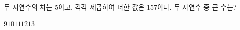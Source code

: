 두 자연수의 차는 $5$이고, 각각 제곱하여 더한 값은 $157$이다. 두 자연수 중 큰 수는?
\begin{choices32}{$9$}{$10$}{$11$}{$12$}{$13$}\end{choices32}
